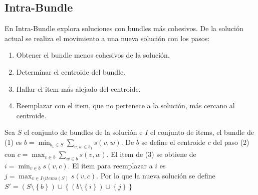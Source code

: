 \subsection{Intra-Bundle}
En Intra-Bundle explora soluciones con bundles más cohesivos. De la solución actual se realiza el movimiento a una nueva solución con los pasos:
\begin{enumerate}
	\item Obtener el bundle menos cohesivos de la solución.
	\item Determinar el centroide del bundle.
	\item Hallar el item más alejado del centroide.
	\item Reemplazar con el item, que no pertenece a la solución, más cercano al centroide.
\end{enumerate}

Sea $S$ el conjunto de bundles de la solución e $I$ el conjunto de items, el bundle de (1) es $b = \min_{b_1 \in S}{\sum_{v,w \in b_1}{s(v,w)}}$. De $b$ se define el centroide $c$ del paso (2) con $c = \max_{v \in b}{\sum_{w \in b}{s(v,w)}}$. El item de (3) se obtiene de $i = \min_{v \in b}{s(v,c)}$. El item para reemplazar a $i$ es $j = \max_{v \in I \setminus items(S)}{s(v,c)}$. Por lo que la nueva solución se define $S' = (S \setminus \left\{b\right\}) \cup \left\{(b \setminus \left\{i\right\})\cup\left\{j\right\}\right\}$
 
